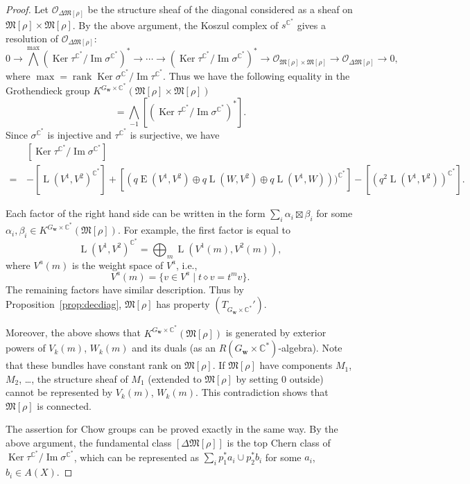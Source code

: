 \documentclass[12pt]{amsart}
\def\Bbb{\mathbb}
\def\frak{\mathfrak}
\theoremstyle{definition}
\theoremstyle{remark}
\numberwithin{equation}{subsection}
\newcommand{\propref}[1]{Proposition~\ref{#1}}
\newcommand{\C}{{\Bbb C}}
\newcommand{\Ker}{\operatorname{Ker}}
\newcommand{\Ima}{\operatorname{Im}}
\newcommand{\rank}{\operatorname{rank}}
\newcommand{\M}{{\frak M}} %
\newcommand{\Fi}{{\frak F}} %
\newcommand{\bw}{{\mathbf w}} %
\newcommand{\HomE}{\operatorname{E}}
\newcommand{\HomL}{\operatorname{L}}
\newcommand{\shfO}{\mathcal O}
\newcommand{\Wedge}{{\textstyle \bigwedge}}
\begin{document}
\begin{proof}
Let $\shfO_{\Delta\M[\rho]}$ be the structure sheaf of the diagonal
considered as a sheaf on $\M[\rho]\times\M[\rho]$. By the above
argument, the Koszul complex of $s^{\C^*}$ gives a resolution of
$\shfO_{\Delta\M[\rho]}$:
\begin{equation*}
  0 \to \Wedge^{\max} 
  (\Ker\tau^{\C^*}/\Ima\sigma^{\C^*})^* \to
  \cdots \to (\Ker\tau^{\C^*}/\Ima\sigma^{\C^*})^*
  \to \shfO_{\M[\rho]\times\M[\rho]}
  \to \shfO_{\Delta\M[\rho]} \to 0,
\end{equation*}
where $\max = \rank\Ker\sigma^{\C^*}/\Ima\tau^{\C^*}$.
Thus we have the following equality in the Grothendieck group
$K^{G_\bw\times\C^*}(\M[\rho]\times\M[\rho])$
\begin{equation*}
   [\shfO_{\Delta\Fi}] =
   \Wedge_{-1} [(\Ker\tau^{\C^*}/\Ima\sigma^{\C^*})^*].
\end{equation*}
Since $\sigma^{\C^*}$ is injective and $\tau^{\C^*}$ is surjective, we have
\begin{equation*}
\begin{split}
  & [\Ker\tau^{\C^*}/\Ima\sigma^{\C^*}] \\
  =\, & 
  - [ \HomL(V^1, V^2)^{\C^*} ]
  + \left[ (q\HomE(V^1,V^2) \oplus
    q \HomL(W, V^2) \oplus q\HomL(V^1,W)))^{\C^*}\right]
  - [(q^2 \HomL(V^1, V^2))^{\C^*}].
\end{split}
\end{equation*}

Each factor of the right hand side can be written in the form
$\sum_i \alpha_i\boxtimes \beta_i$ for some
$\alpha_i, \beta_i\in K^{G_\bw\times\C^*}(\M[\rho])$.
For example, the first factor is equal to
\begin{equation*}
   \HomL(V^1, V^2)^{\C^*} = \bigoplus_m \HomL(V^1(m), V^2(m)),
\end{equation*}
where $V^a(m)$ is the weight space of $V^a$, i.e.,
\begin{equation*}
   V^a(m) = \{ v\in V^a \mid t\diamond v = t^m v\}.
\end{equation*}
The remaining factors have similar description. Thus by
\propref{prop:decdiag}, $\M[\rho]$ has property
$(T_{G_\bw\times\C^*}')$.

Moreover, the above shows that $K^{G_\bw\times\C^*}(\M[\rho])$ is
generated by exterior powers of $V_k(m)$, $W_k(m)$ and its duals
(as an $R(G_\bw\times\C^*)$-algebra).
%
Note that these bundles have constant rank on $\M[\rho]$. If
$\M[\rho]$ have components $M_1$, $M_2$, \dots, the structure sheaf of
$M_1$ (extended to $\M[\rho]$ by setting $0$ outside) cannot be
represented by $V_k(m)$, $W_k(m)$.  This contradiction shows that
$\M[\rho]$ is connected.

The assertion for Chow groups can be proved exactly in the same
way. By the above argument, the fundamental class $[\Delta\M[\rho]]$
is the top Chern class of $\Ker\tau^{\C^*}/\Ima\sigma^{\C^*}$, which
can be represented as $\sum_i p_1^* a_i\cup p_2^* b_i$ for some $a_i$, 
$b_i\in A(X)$.
\end{proof}
\end{document}
